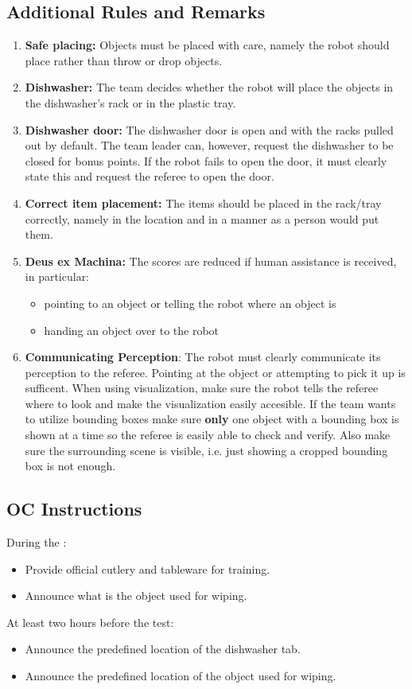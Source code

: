 \subsection*{Additional Rules and Remarks}
\begin{enumerate}[nosep]
	\item \textbf{Safe placing:} Objects must be placed with care, namely the robot should place rather than throw or drop objects.
	\item \textbf{Dishwasher:} The team decides whether the robot will place the objects in the dishwasher's rack or in the plastic tray.
	\item \textbf{Dishwasher door:} The dishwasher door is open and with the racks pulled out by default.
	The team leader can, however, request the dishwasher to be closed for bonus points. If the robot fails to open the door, it must clearly state this and request the referee to open the door.
	\item \textbf{Correct item placement:} The items should be placed in the rack/tray correctly, namely in the location and in a manner as a person would put them.
	\item \textbf{Deus ex Machina:} The scores are reduced if human assistance is received, in particular:
	\begin{itemize}[nosep]
		\item pointing to an object or telling the robot where an object is
		\item handing an object over to the robot
	\end{itemize}
	\item \textbf{Communicating Perception}: The robot must clearly communicate its perception to the referee.
	Pointing at the object or attempting to pick it up is sufficent. When using visualization, make sure the robot 
	tells the referee where to look and make the visualization easily accesible. 
	If the team wants to utilize bounding boxes make sure \textbf{only} one object with a bounding box is shown 
	at a time so the referee is easily able to check and verify. Also make sure the surrounding scene is visible, i.e.
	just showing a cropped bounding box is not enough.
\end{enumerate}

\subsection*{OC Instructions}

During the \SetupDays:
\begin{itemize}
	\item Provide official cutlery and tableware for training.
	\item Announce what is the object used for wiping.
\end{itemize}
At least two hours before the test:
\begin{itemize}
	\item Announce the predefined location of the dishwasher tab.
	\item Announce the predefined location of the object used for wiping.
\end{itemize}


